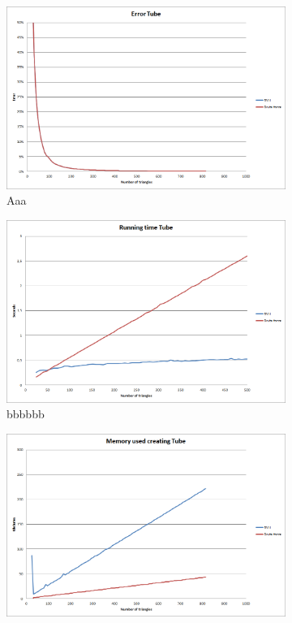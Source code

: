 \documentclass[11pt,twoside,a4paper]{report}
\begin{document}
\begin{figure}[h] \centering 
	\begin{subfigure}[h]{0.49\textwidth}
	\includegraphics[width=\textwidth]{images/chart_tube_error}
	\caption{Aaa} \label{fig:gull} \end{subfigure}
    \begin{subfigure}[h]{0.49\textwidth}
	\includegraphics[width=\textwidth]{images/chart_tube_running_time}
    \caption{bbbbbb} \label{fig:tiger} \end{subfigure}
	\begin{subfigure}[h]{0.49\textwidth} 
	\includegraphics[width=\textwidth]{images/chart_tube_creation_memory}

\end{subfigure}
\end{figure}
\end{document}
